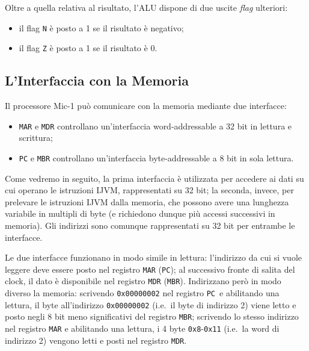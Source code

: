 \documentclass[a4paper,12pt]{scrreprt}
\begin{document}
Oltre a quella relativa al risultato, l'ALU dispone di due uscite \textit{flag}
ulteriori:
\begin{itemize}
  \item il flag \lstinline{N} è posto a 1 se il risultato è negativo;
  \item il flag \lstinline{Z} è posto a 1 se il risultato è 0.
\end{itemize}

\subsection{L'Interfaccia con la Memoria}

Il processore Mic-1 può comunicare con la memoria mediante due interfacce:
\begin{itemize}
  \item \lstinline{MAR} e \lstinline{MDR} controllano un'interfaccia
  word-addressable a 32 bit in lettura e scrittura;
  \item \lstinline{PC} e \lstinline{MBR} controllano un'interfaccia
  byte-addressable a 8 bit in sola lettura.
\end{itemize}

\begin{mynote}{}{}
  Come vedremo in seguito, la prima interfaccia è utilizzata per accedere ai
  dati su cui operano le istruzioni IJVM, rappresentati su 32 bit; la seconda,
  invece, per prelevare le istruzioni IJVM dalla memoria, che possono avere una
  lunghezza variabile in multipli di byte (e richiedono dunque più accessi
  successivi in memoria). Gli indirizzi sono comunque rappresentati su 32 bit
  per entrambe le interfacce.
\end{mynote}

Le due interfacce funzionano in modo simile in lettura: l'indirizzo da cui si
vuole leggere deve essere posto nel registro \lstinline{MAR} (\lstinline{PC});
al successivo fronte di salita del clock, il dato è disponibile nel registro
\lstinline{MDR} (\lstinline{MBR}). Indirizzano però in modo diverso la memoria:
scrivendo \lstinline{0x00000002} nel registro \lstinline{PC} e abilitando una
lettura, il byte all'indirizzo \lstinline{0x00000002} (i.e.~il byte di indirizzo
2) viene letto e posto negli 8 bit meno significativi del registro
\lstinline{MBR}; scrivendo lo stesso indirizzo nel registro \lstinline{MAR} e
abilitando una lettura, i 4 byte \lstinline{0x8}-\lstinline{0x11} (i.e.~la word
di indirizzo 2) vengono letti e posti nel registro \lstinline{MDR}.
\end{document}

